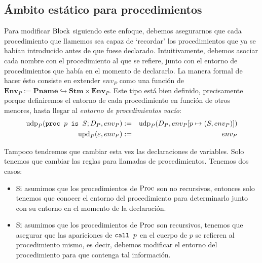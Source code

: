 \subsection{Ámbito estático para procedimientos}

Para modificar $\mathrm{Block}$ siguiendo este enfoque, debemos asegurarnos que cada procedimiento que llamemos sea capaz de `recordar' los procedimientos que ya se habían introducido antes de que fuese declarado. Intuitivamente, debemos asociar cada nombre con el procedimiento al que se refiere, junto con el entorno de procedimientos que había en el momento de declararlo. La manera formal de hacer ésto consiste en extender $env_P$ como una función de $\mathbf{Env}_P := \mathbf{Pname} \hookrightarrow\mathbf{Stm}\times \mathbf{Env}_P$. Este tipo está bien definido, precisamente porque definiremos el entorno de cada procedimiento en función de otros menores, hasta llegar al \textit{entorno de procedimientos vacío}:
\begin{eqnarray*}
    \mathrm{udp}_P(\texttt{proc }p\texttt{ is }S;D_P, env_P) &:=& \mathrm{udp}_P(D_P, env_P[p\mapsto (S, env_P)])\\
    \mathrm{upd}_P(\varepsilon, env_P) &:=& env_P\\
\end{eqnarray*}

Tampoco tendremos que cambiar esta vez las declaraciones de variables. Solo tenemos que cambiar las reglas para llamadas de procedimientos. Tenemos dos casos:
\begin{itemize}
    \item Si asumimos que los procedimientos de $\mathrm{Proc}$ son no recursivos, entonces solo tenemos que conocer el entorno del procedimiento para determinarlo junto con su entorno en el momento de la declaración.
    \item Si asumimos que los procedimientos de $\mathrm{Proc}$ son recursivos, tenemos que asegurar que las apariciones de $\texttt{call }p$ en el cuerpo de $p$ se refieren al procedimiento mismo, es decir, debemos modificar el entorno del procedimiento para que contenga tal información.
\end{itemize}

